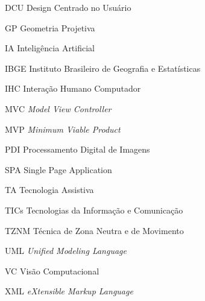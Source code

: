 \documentclass[ruledheader,noindentfirst,anapcustomindent,abntfigtabnum,tocpage=plain]{abnt}
\begin{document}
%
%
\renewcommand{\rmdefault}{phv}      %
%
%
%

%

\pagestyle{plain}%


%
\listoffigures

\listoftables

\begin{basedescript}{\desclabelstyle{\pushlabel}\desclabelwidth{6em}}
\item[{DCU}] Design Centrado no Usuário%
\item[{GP}] Geometria Projetiva%
\item[{IA}] Inteligência Artificial%
\item[{IBGE}] Instituto Brasileiro de Geografia e Estatísticas%
\item[{IHC}] Interação Humano Computador%
\item[{MVC}] \textit{Model View Controller}%
\item[{MVP}] \textit{Minimum Viable Product}%
\item[{PDI}] Processamento Digital de Imagens%
\item[{SPA}] Single Page Application%
\item[{TA}] Tecnologia Assistiva%
\item[{TICs}] Tecnologias  da Informação e Comunicação%
\item[{TZNM}] Técnica de Zona Neutra e de Movimento
\item[{UML}] \textit{Unified Modeling Language}%
\item[{VC}] Visão Computacional%
\item[{XML}] \textit{eXtensible Markup Language}%
\end{basedescript}

\tableofcontents


%

\newpage
\end{document}
